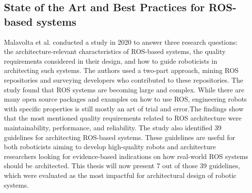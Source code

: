 \documentclass[%
paper=A4,               %
twoside=true,           %
openright,              %
11pt,                   %
bibliography=totoc,     %
titlepage=on,           %
DIV=12,                 %
BCOR=1.5cm,             %
parskip=half,            %
final
]{scrreprt}
\begin{document}
	\subsection{State of the Art and Best Practices for ROS-based systems}
	Malavolta et al. \autocite{malavoltaHowYouArchitect2020} conducted a study in 2020 to answer three research questions: the architecture-relevant characteristics of ROS-based systems, the quality requirements considered in their design, and how to guide roboticists in architecting such systems. The authors used a two-part approach, mining ROS repositories and surveying developers who contributed to these repositories. The study found that ROS systems are becoming large and complex. While there are many open source packages and examples on how to use ROS, engineering robots with specific properties is still mostly an art of trial and error.The findings show that the most mentioned quality requirements related to ROS architecture were maintainability, performance, and reliability. The study also identified 39 guidelines for architecting ROS-based systems. These guidelines are useful for both roboticists aiming to develop high-quality robots and architecture researchers looking for evidence-based indications on how real-world ROS systems should be architected. 
	\newline
	This thesis will now present 7 out of those 39 guidelines, which were evaluated as the most impactful for architectural design of robotic systems.
	\autocite{malavoltaHowYouArchitect2020}
\end{document}
